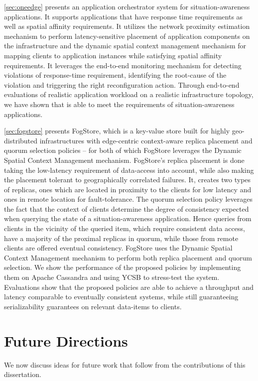 \par \cref{sec:oneedge} presents an application orchestrator system for situation-awareness applications. It supports applications that have response time requirements as well as spatial affinity requirements. It utilizes the network proximity estimation mechanism to perform latency-sensitive placement of application components on the infrastructure and the dynamic spatial context management mechanism for mapping clients to application instances while satisfying spatial affinity requirements. It leverages the end-to-end monitoring mechanism for detecting violations of response-time requirement, identifying the root-cause of the violation and triggering the right reconfiguration action. Through end-to-end evaluations of realistic application workload on a realistic infrastructure topology, we have shown that \oneedge{} is able to meet the requirements of situation-awareness applications.
\par \cref{sec:fogstore} presents FogStore, which is a key-value store built for highly geo-distributed infrastructures with edge-centric context-aware replica placement and quorum selection policies -- for both of which FogStore leverages the Dynamic Spatial Context Management mechanism. FogStore's replica placement is done taking the low-latency requirement of data-access into account, while also making the placement tolerant to geographically correlated failures. It, creates two types of replicas, ones which are located in proximity to the clients for low latency and ones in remote location for fault-tolerance. The quorum selection policy leverages the fact that the context of clients determine the degree of consistency expected when querying the state of a situation-awareness application. Hence queries from clients in the vicinity of the queried item, which require consistent data access, have a majority of the proximal replicas in quorum, while those from remote clients are offered eventual consistency. FogStore uses the Dynamic Spatial Context Management mechanism to perform both replica placement and quorum selection. We show the performance of the proposed policies by implementing them on Apache Cassandra and using YCSB to stress-test the system. Evaluations show that the proposed policies are able to achieve a throughput and latency comparable to eventually consistent systems, while still guaranteeing serializability guarantees on relevant data-items to clients.

\section{Future Directions}
We now discuss ideas for future work that follow from the contributions of this dissertation.
